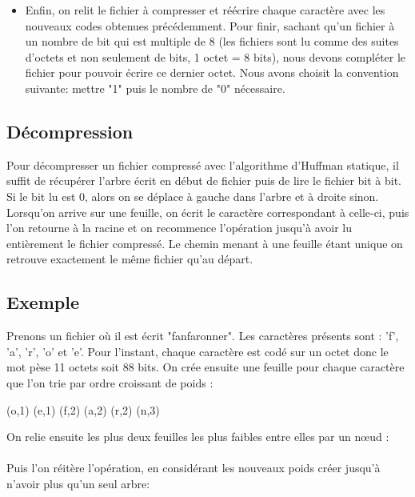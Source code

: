 \documentclass{report}
\begin{document}
\begin{itemize}
\item Enfin, on relit le fichier à compresser et réécrire chaque caractère avec les nouveaux codes obtenues précédemment. Pour finir, sachant qu'un fichier à un nombre de bit qui est multiple de 8 (les fichiers sont lu comme des suites d'octets et non seulement de bits, 1 octet = 8 bits), nous devons compléter le fichier pour pouvoir écrire ce dernier octet.
Nous avons choisit la convention suivante: mettre "1" puis le nombre de "0" nécessaire. 

\end{itemize}
\subsection*{Décompression}
Pour décompresser un fichier compressé avec l'algorithme d'Huffman statique, il suffit de récupérer l'arbre écrit en début de fichier puis de lire le fichier bit à bit. Si le bit lu est  0, alors on se déplace à gauche dans l'arbre et à droite sinon. Lorsqu'on arrive sur une feuille, on écrit le caractère correspondant à celle-ci, puis l'on retourne à la racine et on recommence l'opération jusqu'à avoir lu entièrement le fichier compressé. Le chemin menant à une feuille étant unique on retrouve exactement le même fichier qu'au départ.
\subsection*{Exemple}
Prenons un fichier où il est écrit "fanfaronner". Les caractères présents sont : 'f', 'a', 'r', 'o' et 'e'. Pour l'instant, chaque caractère est codé sur un octet donc le mot pèse 11 octets soit 88 bits.
On crée ensuite une feuille pour chaque caractère que l'on trie par ordre croissant de poids :
\begin{center}
(o,1) (e,1) (f,2) (a,2) (r,2) (n,3)
\end{center}
On relie ensuite les plus deux feuilles les plus faibles entre elles par un nœud :
\begin{center}
\end{center}
\paragraph*{}
Puis l'on réitère l'opération, en considérant les nouveaux poids créer jusqu'à n'avoir plus qu'un seul arbre:
\end{document}
